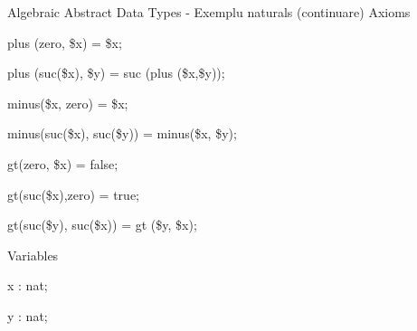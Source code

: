 \documentclass{beamer}
\begin{document}
\begin{frame}{Algebraic Abstract Data Types - Exemplu naturals (continuare)}
	Axioms
	

\hspace{0.5cm}		plus (zero, \$x) = \$x;

\hspace{0.5cm}		plus (suc(\$x), \$y) = suc (plus (\$x,\$y));

\vspace{0.25cm}

\hspace{0.5cm}		minus(\$x, zero) = \$x;

\hspace{0.5cm}		minus(suc(\$x), suc(\$y)) = minus(\$x, \$y);

\vspace{0.25cm}
		 
		
		

\hspace{0.5cm}		gt(zero, \$x) = false;

\hspace{0.5cm}		gt(suc(\$x),zero) = true;

\hspace{0.5cm}		gt(suc(\$y), suc(\$x)) = gt (\$y, \$x);

\vspace{0.25cm}
		
		
		
		
		
		
		
	Variables
	
\hspace{0.5cm}		x : nat;

\hspace{0.5cm}		y : nat;

\end{frame}
\end{document}
